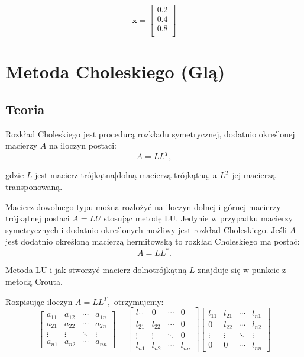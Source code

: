 \documentclass[a4paper]{article}
\begin{document}
$$ \mathbf{x} =
\begin{bmatrix}
0.2 \\
0.4 \\
0.8\\
\end{bmatrix}$$


\section{Metoda Choleskiego (Glą)}
\subsection{Teoria}
Rozkład Choleskiego jest procedurą rozkładu symetrycznej, dodatnio określonej  macierzy $A$ na iloczyn postaci:
 $$A=LL^T,$$

gdzie $L$ jest macierz trójkątna|dolną macierzą trójkątną, a $L^T$ jej macierzą transponowaną.

Macierz dowolnego typu można rozłożyć na iloczyn dolnej i górnej macierzy trójkątnej postaci $A=LU$ stosując metodę LU. Jedynie w przypadku macierzy symetrycznych i dodatnio określonych możliwy jest rozkład Choleskiego. Jeśli $A$ jest dodatnio określoną macierzą hermitowską to rozkład Choleskiego ma postać:
$$A=LL^*.$$

Metoda LU i jak stworzyć macierz dolnotrójkątną $L$ znajduje się w punkcie z metodą Crouta.

Rozpisując iloczyn $A=LL^T,$ otrzymujemy:
$$\begin{bmatrix}
a_{11} & a_{12} & \cdots & a_{1n} \\
a_{21} & a_{22} & \cdots & a_{2n} \\
\vdots & \vdots & \ddots & \vdots \\
a_{n1} & a_{n2} & \cdots & a_{nn}
\end{bmatrix}=
\begin{bmatrix}
l_{11} & 0 & \cdots & 0 \\
l_{21} & l_{22} & \cdots & 0 \\
\vdots & \vdots & \ddots & 0 \\
l_{n1} & l_{n2} & \cdots & l_{nn}
\end{bmatrix}
\begin{bmatrix}
l_{11} & l_{21} & \cdots & l_{n1} \\
0 & l_{22} & \cdots & l_{n2} \\
\vdots & \vdots & \ddots & \vdots \\
0 & 0 & \cdots & l_{nn}
\end{bmatrix}$$
\end{document}

